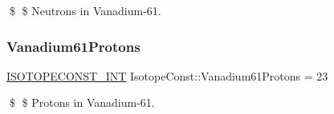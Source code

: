 \$ \$ Neutrons in Vanadium-\/61. \mbox{\label{group___isotope_const-_vanadium-_v61_ga5c25700c69360b5a5e7ee59717cb2cc0}} 
\subsubsection{\texorpdfstring{Vanadium61\+Protons}{Vanadium61Protons}}
{\footnotesize\ttfamily \mbox{\hyperlink{group___isotope_const-_macros_ga5f18360b3e99483a35c32d789e62621c}{I\+S\+O\+T\+O\+P\+E\+C\+O\+N\+S\+T\+\_\+\+I\+NT}} Isotope\+Const\+::\+Vanadium61\+Protons = 23}

\$ \$ Protons in Vanadium-\/61. 